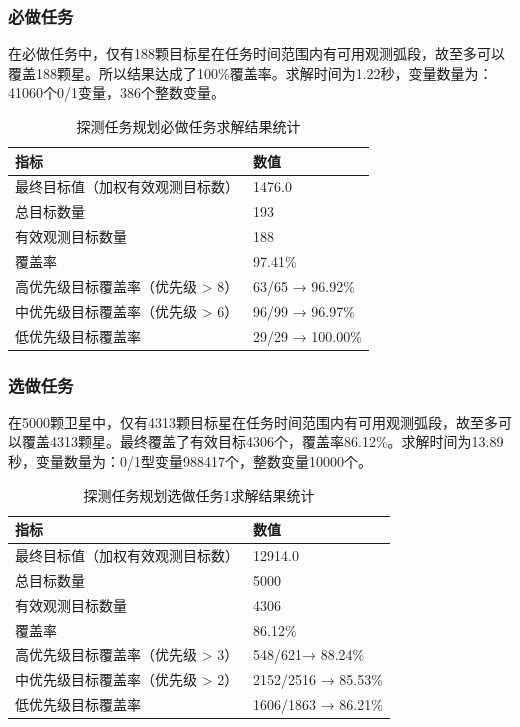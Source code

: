 \documentclass[openany,12pt,UTF8]{ctexart}
\begin{document}
\subsubsection{必做任务}
在必做任务中，仅有188颗目标星在任务时间范围内有可用观测弧段，故至多可以覆盖188颗星。所以结果达成了100\%覆盖率。求解时间为1.22秒，变量数量为：41060个0/1变量，386个整数变量。
\begin{table}[h]
    \centering
    \caption{探测任务规划必做任务求解结果统计}
    \label{tab:探测任务规划必做任务求解结果统计}
    \begin{tabularx}{0.8\columnwidth}{Xl}
        \toprule
        \textbf{指标}        & \textbf{数值}      \\
        \midrule
        最终目标值（加权有效观测目标数）   & 1476.0           \\
        总目标数量              & 193              \\
        有效观测目标数量           & 188              \\
        覆盖率                & 97.41\%          \\
        高优先级目标覆盖率（优先级 > 8） & 63/65 → 96.92\%  \\
        中优先级目标覆盖率（优先级 > 6） & 96/99 → 96.97\%  \\
        低优先级目标覆盖率          & 29/29 → 100.00\% \\
        \bottomrule
    \end{tabularx}
\end{table}

\subsubsection{选做任务}
在5000颗卫星中，仅有4313颗目标星在任务时间范围内有可用观测弧段，故至多可以覆盖4313颗星。最终覆盖了有效目标4306个，覆盖率86.12\%。求解时间为13.89秒，变量数量为：0/1型变量988417个，整数变量10000个。
\begin{table}[h]
    \centering
    \caption{探测任务规划选做任务1求解结果统计}
    \label{tab:探测任务规划选做任务1求解结果统计}
    \begin{tabularx}{0.8\columnwidth}{Xl}
        \toprule
        \textbf{指标}        & \textbf{数值}      \\
        \midrule
        最终目标值（加权有效观测目标数）   & 12914.0           \\
        总目标数量              & 5000              \\
        有效观测目标数量           & 4306              \\
        覆盖率                & 86.12\%          \\
        高优先级目标覆盖率（优先级 > 3） & 548/621→ 88.24\%  \\
        中优先级目标覆盖率（优先级 > 2） & 2152/2516 → 85.53\%  \\
        低优先级目标覆盖率          & 1606/1863 → 86.21\% \\
        \bottomrule
    \end{tabularx}
\end{table}
\end{document}
